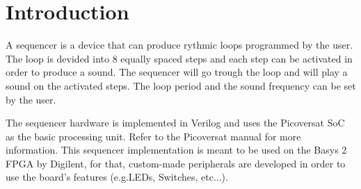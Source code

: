 \section{Introduction}

\noindent
A sequencer is a device that can produce rythmic loops programmed by the user. The loop is devided into 8 equally spaced steps and each step can be activated in order to produce a sound. The sequencer will go trough the loop and will play a sound on the activated steps. The loop period and the sound frequency can be set by the user.

\noindent
The sequencer hardware is implemented in Verilog and uses the Picoversat SoC as the basic processing unit. Refer to the Picoversat manual for more information. 
This sequencer implementation is meant to be used on the Basys 2 FPGA by Digilent, for that, custom-made peripherals are developed in order to use the board's features (e.g.LEDs, Switches, etc...).
